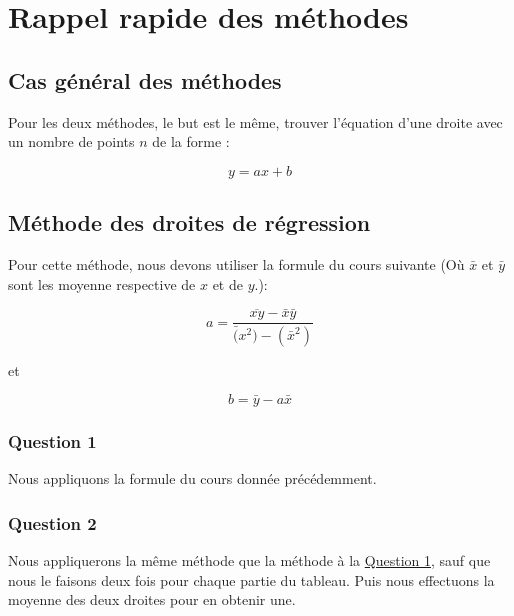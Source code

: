 \documentclass[letter]{article}
\date{\today}
\title{}
\begin{document}





\setcounter{tocdepth}{2}
\tableofcontents

\newpage

\section{Rappel rapide des méthodes}
\label{sec:org72f685e}


\subsection{Cas général des méthodes}
\label{sec:orgad6ac0e}

Pour les deux méthodes, le but est le même, trouver l'équation d'une droite avec un nombre de points \(n\) de la forme :


\[ y= ax + b  \]




\subsection{Méthode des droites de régression}
\label{sec:org682519e}

Pour cette méthode, nous devons utiliser la formule du cours suivante (Où \(\bar{x}\) et \(\bar{y}\) sont les moyenne respective de \(x\) et de \(y\).):

\[ a =\frac{\overline{xy}-\bar{x}\bar{y}}{\bar(x^2)-(\bar{x}^2)}  \]


et

\[ b= \bar{y}-a\bar{x}  \]



\subsubsection{Question 1}
\label{sec:orgbd2229a}

Nous appliquons la formule du cours donnée précédemment.


\subsubsection{Question 2}
\label{sec:org1a79d34}

Nous appliquerons la même méthode que la méthode à la \hyperref[sec:orgbd2229a]{Question 1}, sauf que nous le faisons deux fois pour chaque partie du tableau.
Puis nous effectuons la moyenne des deux droites pour en obtenir une.
\end{document}
